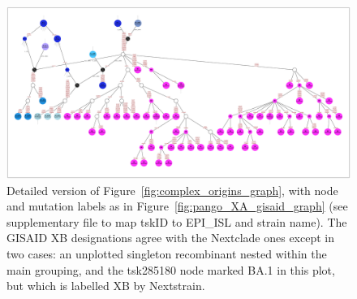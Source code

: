 \documentclass{article}
\begin{document}
\begin{figure} \centering
\includegraphics[width=\textwidth]{figures/Pango_XB_gisaid_large_graph.pdf}
\caption{\label{fig:pango_XB_gisaid_graph}
Detailed version of Figure~\ref{fig:complex_origins_graph}, with node and mutation labels as in
Figure~\ref{fig:pango_XA_gisaid_graph} (see supplementary file \protect{}
to map tskID to EPI\_ISL and strain name).
The GISAID XB designations agree with the Nextclade ones except in two cases: an unplotted
singleton recombinant nested within the main grouping, and the tsk285180 node marked BA.1 in this plot,
but which is labelled XB by Nextstrain.
}
\end{figure}

\end{document}
